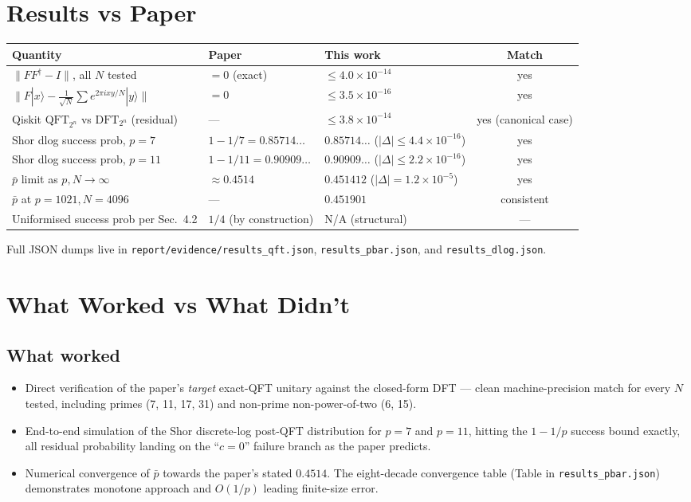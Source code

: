 \documentclass[11pt]{article}
\begin{document}
\section{Results vs Paper}
\begin{center}
\begin{tabular}{@{}lllc@{}}
\toprule
Quantity & Paper & This work & Match \\
\midrule
$\|F F^\dagger - I\|$, all $N$ tested & $= 0$ (exact) & $\le 4.0\times 10^{-14}$ & yes \\
$\| F|x\rangle - \frac{1}{\sqrt N}\sum e^{2\pi i xy/N}|y\rangle\|$ & $= 0$ & $\le 3.5\times 10^{-16}$ & yes \\
Qiskit $\text{QFT}_{2^n}$ vs $\text{DFT}_{2^n}$ (residual) & --- & $\le 3.8\times 10^{-14}$ & yes (canonical case) \\
Shor dlog success prob, $p=7$ & $1 - 1/7 = 0.85714\ldots$ & $0.85714\ldots$ ($|\Delta| \le 4.4\times 10^{-16}$) & yes \\
Shor dlog success prob, $p=11$ & $1 - 1/11 = 0.90909\ldots$ & $0.90909\ldots$ ($|\Delta| \le 2.2\times 10^{-16}$) & yes \\
$\bar p$ limit as $p, N \to \infty$ & $\approx 0.4514$ & $0.451412$ ($|\Delta| = 1.2\times 10^{-5}$) & yes \\
$\bar p$ at $p=1021, N=4096$ & --- & $0.451901$ & consistent \\
Uniformised success prob per Sec.~4.2 & $1/4$ (by construction) & N/A (structural) & --- \\
\bottomrule
\end{tabular}
\end{center}

Full JSON dumps live in \texttt{report/evidence/results\_qft.json},
\texttt{results\_pbar.json}, and \texttt{results\_dlog.json}.

\section{What Worked vs What Didn't}
\subsection*{What worked}
\begin{itemize}
  \item Direct verification of the paper's \emph{target} exact-QFT unitary against
    the closed-form DFT --- clean machine-precision match for every $N$ tested,
    including primes (7, 11, 17, 31) and non-prime non-power-of-two (6, 15).
  \item End-to-end simulation of the Shor discrete-log post-QFT distribution for
    $p = 7$ and $p = 11$, hitting the $1 - 1/p$ success bound exactly, all
    residual probability landing on the ``$c = 0$'' failure branch as the paper
    predicts.
  \item Numerical convergence of $\bar p$ towards the paper's stated $0.4514$.
    The eight-decade convergence table (Table in \texttt{results\_pbar.json})
    demonstrates monotone approach and $O(1/p)$ leading finite-size error.
\end{itemize}
\end{document}
